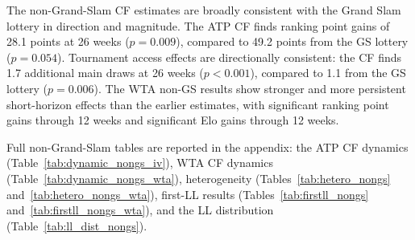 The non-Grand-Slam CF estimates are broadly consistent with the Grand Slam lottery in direction and magnitude. The ATP CF finds ranking point gains of 28.1 points at 26 weeks ($p = 0.009$), compared to 49.2 points from the GS lottery ($p = 0.054$). Tournament access effects are directionally consistent: the CF finds 1.7 additional main draws at 26 weeks ($p < 0.001$), compared to 1.1 from the GS lottery ($p = 0.006$). The WTA non-GS results show stronger and more persistent short-horizon effects than the earlier estimates, with significant ranking point gains through 12 weeks and significant Elo gains through 12 weeks.

Full non-Grand-Slam tables are reported in the appendix: the ATP CF dynamics (Table~\ref{tab:dynamic_nongs_iv}), WTA CF dynamics (Table~\ref{tab:dynamic_nongs_wta}), heterogeneity (Tables~\ref{tab:hetero_nongs} and~\ref{tab:hetero_nongs_wta}), first-LL results (Tables~\ref{tab:firstll_nongs} and~\ref{tab:firstll_nongs_wta}), and the LL distribution (Table~\ref{tab:ll_dist_nongs}).
